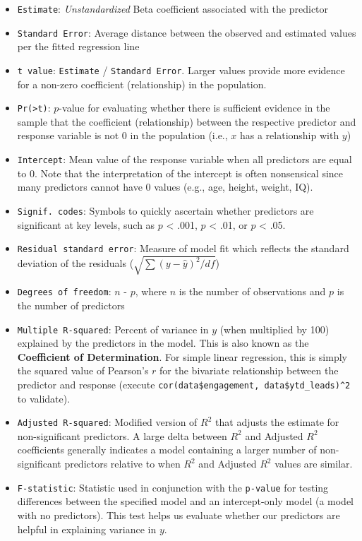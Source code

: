 \documentclass[
]{book}
\providecommand{\tightlist}{%
  \setlength{\itemsep}{0pt}\setlength{\parskip}{0pt}}
\begin{document}
\begin{itemize}
\tightlist
\item
  \texttt{Estimate}: \emph{Unstandardized} Beta coefficient associated with the predictor
\item
  \texttt{Standard\ Error}: Average distance between the observed and estimated values per the fitted regression line
\item
  \texttt{t\ value}: \texttt{Estimate} / \texttt{Standard\ Error}. Larger values provide more evidence for a non-zero coefficient (relationship) in the population.
\item
  \texttt{Pr(\textgreater{}\textbar{}t\textbar{})}: \(p\)-value for evaluating whether there is sufficient evidence in the sample that the coefficient (relationship) between the respective predictor and response variable is not 0 in the population (i.e., \(x\) has a relationship with \(y\))
\item
  \texttt{Intercept}: Mean value of the response variable when all predictors are equal to 0. Note that the interpretation of the intercept is often nonsensical since many predictors cannot have 0 values (e.g., age, height, weight, IQ).
\item
  \texttt{Signif.\ codes}: Symbols to quickly ascertain whether predictors are significant at key levels, such as \(p\) \textless{} .001, \(p\) \textless{} .01, or \(p\) \textless{} .05.
\item
  \texttt{Residual\ standard\ error}: Measure of model fit which reflects the standard deviation of the residuals (\(\sqrt {\sum(y-\hat{y})^2 / df}\))
\item
  \texttt{Degrees\ of\ freedom}: \(n\) - \(p\), where \(n\) is the number of observations and \(p\) is the number of predictors
\item
  \texttt{Multiple\ R-squared}: Percent of variance in \(y\) (when multiplied by 100) explained by the predictors in the model. This is also known as the \textbf{Coefficient of Determination}. For simple linear regression, this is simply the squared value of Pearson's \(r\) for the bivariate relationship between the predictor and response (execute \texttt{cor(data\$engagement,\ data\$ytd\_leads)\^{}2} to validate).
\item
  \texttt{Adjusted\ R-squared}: Modified version of \(R^2\) that adjusts the estimate for non-significant predictors. A large delta between \(R^2\) and Adjusted \(R^2\) coefficients generally indicates a model containing a larger number of non-significant predictors relative to when \(R^2\) and Adjusted \(R^2\) values are similar.
\item
  \texttt{F-statistic}: Statistic used in conjunction with the \texttt{p-value} for testing differences between the specified model and an intercept-only model (a model with no predictors). This test helps us evaluate whether our predictors are helpful in explaining variance in \(y\).
\end{itemize}
\end{document}
